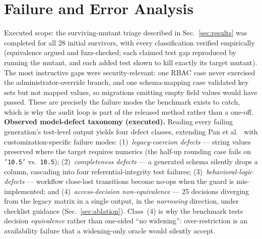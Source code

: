 \documentclass{ieeetj}
\begin{document}
\section{Failure and Error Analysis}
\label{sec:failure}
Executed scope: the surviving-mutant triage described in Sec.~\ref{sec:results} was completed
for all 28 initial survivors, with every classification verified empirically (equivalence
argued and fuzz-checked; each claimed test gap reproduced by running the mutant, and each
added test shown to kill exactly its target mutant). The most instructive gaps were
security-relevant: one RBAC case never exercised the administrator-override branch, and one
schema-mapping case validated key sets but not mapped values, so migrations emitting empty
field values would have passed. These are precisely the failure modes the benchmark exists to
catch, which is why the audit loop is part of the released method rather than a one-off.
\textbf{Observed model-defect taxonomy (executed).} Reading every failing generation's
test-level output yields four defect classes, extending Pan et al.~\cite{pan2024lost} with
customization-specific failure modes: (1)~\emph{legacy-coercion defects} --- string values
preserved where the target requires numerics (the half-up rounding case fails on
\texttt{'10.5'} vs.\ \texttt{10.5}); (2)~\emph{completeness defects} --- a generated schema
silently drops a column, cascading into four referential-integrity test failures;
(3)~\emph{behavioral-logic defects} --- workflow close-lost transitions become no-ops when
the guard is mis-implemented; and (4)~\emph{access-decision non-equivalence} --- 25 decisions
diverging from the legacy matrix in a single output, in the \emph{narrowing} direction,
under checklist guidance (Sec.~\ref{sec:ablation}). Class~(4) is why the benchmark tests
decision \emph{equivalence} rather than one-sided ``no widening'': over-restriction is an
availability failure that a widening-only oracle would silently accept.
\end{document}
